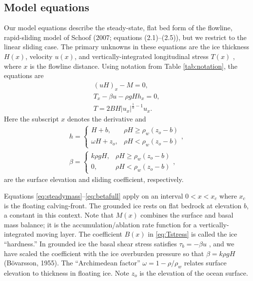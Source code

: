 \documentclass[review,letterpaper]{igs}
\renewcommand{\dh}{\fontencoding{T1}\selectfont{\symbol{240}}}
\newcommand{\citepbod}{(B\"o\dh varsson, 1955)\nocite{Bodvardsson}\xspace}
\begin{document}
\subsection*{Model equations}  Our model equations describe the steady-state, flat bed form of the flowline, rapid-sliding model of Schoof\nocite{SchoofMarine1} (2007; equations (2.1)--(2.5)), but we restrict to the linear sliding case.  The primary unknowns in these equations are the ice thickness $H(x)$, velocity $u(x)$, and vertically-integrated longitudinal stress $T(x)$ \citep{SchoofStream}, where $x$ is the flowline distance.  Using notation from Table \ref{tab:notation}, the equations are
\begin{gather}
(uH)_x - M = 0, \label{eq:steadymass} \\
T_x - \beta u - \rho g H h_x = 0, \label{eq:steadySSA} \\
T = 2 B H |u_x|^{\frac{1}{n}-1} u_x. \label{eq:Tstress}
\end{gather}
Here the subscript $x$ denotes the derivative and
\begin{gather}
h = \begin{cases} H+b,            & \rho H \ge \rho_w (z_o - b) \\
                  \omega H + z_o, & \rho H < \rho_w (z_o - b) \end{cases}, \label{eq:surface} \\
\beta = \begin{cases} k \rho g H,    & \rho H \ge \rho_w (z_o - b) \\
                      0,          & \rho H < \rho_w (z_o - b) \end{cases}, \label{eq:betafull}
\end{gather}
are the surface elevation and sliding coefficient, respectively.

Equations \eqref{eq:steadymass}--\eqref{eq:betafull} apply on an interval $0 < x < x_c$ where $x_c$ is the floating calving-front.  The grounded ice rests on flat bedrock at elevation $b$, a constant in this context.  Note that $M(x)$ combines the surface and basal mass balance; it is the accumulation/ablation rate function for a vertically-integrated moving layer.  The coefficient $B(x)$ in \eqref{eq:Tstress} is called the ice ``hardness.''   In grounded ice the basal shear stress satisfies $\tau_b = - \beta u$ \citep{MacAyeal}, and we have scaled the coefficient with the ice overburden pressure so that $\beta = k \rho g H$ \citepbod.  The ``Archimedean factor'' $\omega = 1 - \rho/\rho_w$ relates surface elevation to thickness in floating ice.  Note $z_o$ is the elevation of the ocean surface.
\end{document}
